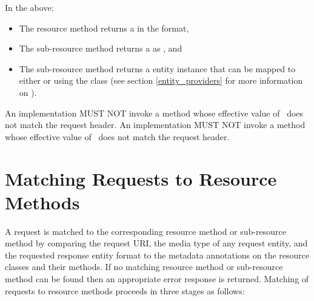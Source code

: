 In the above:
\begin{itemize}
\item The  resource method returns a  in the  format, 
\item The  sub-resource method returns a  as , and
\item The  sub-resource method returns a  entity instance that can be mapped to either  or  using the  class (see section \ref{entity_providers} for more information on \MsgWrite).
\end{itemize}

An implementation MUST NOT invoke a method whose effective value of \ProduceMime\ does not match the request  header. An implementation MUST NOT invoke a method whose effective value of \ConsumeMime\ does not match the request  header.

\section{Matching Requests to Resource Methods}
\label{mapping_requests_to_java_methods}

A request is matched to the corresponding resource method or sub-resource method by comparing the request URI, the media type of any request entity, and the requested response entity format to the metadata annotations on the resource classes and their methods. If no matching resource method or sub-resource method can be found then an appropriate error response is returned. Matching of requests to resource methods proceeds in three stages as follows:

